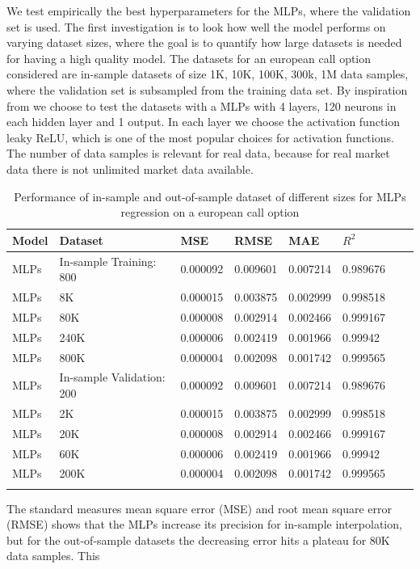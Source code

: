 We test empirically the best hyperparameters for the MLPs, where the validation set is used. The first investigation is to look how well the model performs on varying dataset sizes, where the goal is to quantify how large datasets is needed for having a high quality model. The datasets for an european call option considered are in-sample datasets of size 1K, 10K, 100K, 300k, 1M data samples, where the validation set is subsampled from the training data set. By inspiration from \parencite{HirsaAli2019} we choose to test the datasets with a MLPs with 4 layers, 120 neurons in each hidden layer and 1 output. In each layer we choose the activation function leaky ReLU, which is one of the most popular choices for activation functions. The number of data samples is relevant for real data, because for real market data there is not unlimited market data available.

\begin{table}[H]
\caption{Performance of in-sample and out-of-sample dataset of different sizes for MLPs regression on a european call option}
\label{tab:euroDataSize}
\centering
\begin{tabular}{l l l l l l l l }
\toprule
\textbf{Model} & \textbf{Dataset} & \textbf{MSE} & \textbf{RMSE} & \textbf{MAE} & \textbf{$R^2$} \\
\midrule
MLPs & In-sample Training: 800 & 0.000092 & 0.009601 & 0.007214 & 0.989676\\
MLPs & 8K & 0.000015 & 0.003875 & 0.002999 & 0.998518\\
MLPs & 80K & 0.000008 & 0.002914 & 0.002466 & 0.999167\\
MLPs & 240K & 0.000006 & 0.002419 & 0.001966 & 0.99942\\
MLPs & 800K & 0.000004 & 0.002098 & 0.001742 & 0.999565\\
MLPs & In-sample Validation: 200 & 0.000092 & 0.009601 & 0.007214 & 0.989676\\
MLPs & 2K & 0.000015 & 0.003875 & 0.002999 & 0.998518\\
MLPs & 20K & 0.000008 & 0.002914 & 0.002466 & 0.999167\\
MLPs & 60K & 0.000006 & 0.002419 & 0.001966 & 0.99942\\
MLPs & 200K & 0.000004 & 0.002098 & 0.001742 & 0.999565\\
\bottomrule\\
\end{tabular}
\end{table}

The standard measures mean square error (MSE) and root mean square error (RMSE) shows that the MLPs increase its precision for in-sample interpolation, but for the out-of-sample datasets the decreasing error hits a plateau for 80K data samples. This 


